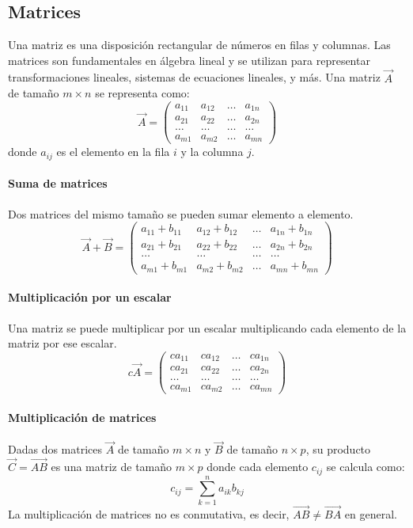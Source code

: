 \subsection{Matrices}
Una matriz es una disposición rectangular de números en filas y columnas. Las matrices son fundamentales en álgebra lineal y se utilizan para representar transformaciones lineales, sistemas de ecuaciones lineales, y más.
Una matriz $\vec{A}$ de tamaño $m \times n$ se representa como:
$$\vec{A} = \begin{pmatrix}
a_{11} & a_{12} & \ldots & a_{1n} \\
a_{21} & a_{22} & \ldots & a_{2n} \\
\ldots & \ldots & \ldots & \ldots \\
a_{m1} & a_{m2} & \ldots & a_{mn} 
\end{pmatrix}$$
donde $a_{ij}$ es el elemento en la fila $i$ y la columna $j$.

\paragraph{Suma de matrices} Dos matrices del mismo tamaño se pueden sumar elemento a elemento.
$$\vec{A} + \vec{B} = \begin{pmatrix}
a_{11} + b_{11} & a_{12} + b_{12} & \ldots & a_{1n} + b_{1n} \\
a_{21} + b_{21} & a_{22} + b_{22} & \ldots & a_{2n} + b_{2n} \\
\ldots & \ldots & \ldots & \ldots \\
a_{m1} + b_{m1} & a_{m2} + b_{m2} & \ldots & a_{mn} + b_{mn}
\end{pmatrix}$$

\paragraph{Multiplicación por un escalar} Una matriz se puede multiplicar por un escalar multiplicando cada elemento de la matriz por ese escalar.
$$c\vec{A} = \begin{pmatrix}
ca_{11} & ca_{12} & \ldots & ca_{1n} \\
ca_{21} & ca_{22} & \ldots & ca_{2n} \\
\ldots & \ldots & \ldots & \ldots \\
ca_{m1} & ca_{m2} & \ldots & ca_{mn} 
\end{pmatrix}$$

\paragraph{Multiplicación de matrices} Dadas dos matrices $\vec{A}$ de tamaño $m \times n$ y $\vec{B}$ de tamaño $n \times p$, su producto $\vec{C} = \vec{AB}$ es una matriz de tamaño $m \times p$ donde cada elemento $c_{ij}$ se calcula como:
$$c_{ij} = \sum^n_{k=1} a_{ik}b_{kj}$$
La multiplicación de matrices no es conmutativa, es decir, $\vec{AB} \neq \vec{BA}$ en general.

